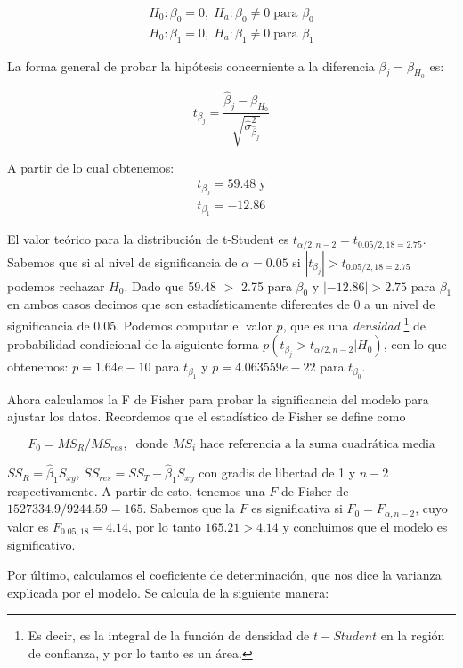 \documentclass[letterpaper,12pt]{article}
\begin{document}
\[
\begin{aligned}
H_0: \beta_0 = 0,\; H_a: \beta_0 \neq 0\; \text{para $\beta_0$}\\\hline
H_0: \beta_1 = 0,\; H_a: \beta_1 \neq 0\; \text{para $\beta_1$}
\end{aligned}
\]

La forma general de probar la hipótesis concerniente a la diferencia $\beta_j = \beta_{H_0}$ es:

\begin{equation}
	t_{\beta_j} = \frac{\hat{\beta}_j-\beta_{H_0}}{\sqrt{\hat{\sigma}_{\hat{\beta}_j}^2}}
\end{equation}

A partir de lo cual obtenemos:
\[
\begin{aligned}
t_{\beta_0} = 59.48\; \text{y} \\
t_{\beta_1} = -12.86
\end{aligned}
\]

El valor teórico para la distribución de t-Student es $t_{\alpha/2,n-2} = t_{0.05/2,18 = 2.75}$. Sabemos que si al nivel de significancia de $\alpha = 0.05$ si $|t_{\beta_j}| > t_{0.05/2,18 = 2.75}$ podemos rechazar $H_0$. Dado que 59.48 $>$ 2.75 para $\beta_0$ y $|-12.86|>2.75$ para $\beta_1$ en ambos casos decimos que son estadísticamente diferentes de 0 a un nivel de significancia de 0.05. Podemos computar el valor $p$, que es una \textit{densidad} \footnote{Es decir, es la integral de la función de densidad de $t-Student$ en la región de confianza, y por lo tanto es un área.} de probabilidad condicional de la siguiente forma $p(t_{\beta_{j}}> t_{\alpha/2,n-2}|H_0)$, con lo que obtenemos: $p = 1.64e-10$ para $t_{\beta_1}$ y $p =4.063559e-22$ para $t_{\beta_0}$. 

Ahora calculamos la F de Fisher para probar la significancia del modelo para ajustar los datos. Recordemos que el estadístico de Fisher se define como


\[
F_0 = MS_R/MS_{res},\;\; \text{donde $MS_i$ hace referencia a la suma cuadrática media}
\]

$SS_R = \hat{\beta}_1S_{xy}$, $SS_{res} = SS_T - \hat{\beta}_1S_{xy}$ con gradis de libertad de 1 y $n-2$ respectivamente. A partir de esto, tenemos una $F$ de Fisher de $1527334.9/9244.59 = 165$. Sabemos que la $F$ es significativa si $F_0 = F_{\alpha,n-2}$, cuyo valor es $F_{0.05,18}=4.14$, por lo tanto $165.21>4.14$ y concluimos que el modelo es significativo. 

Por último, calculamos el coeficiente de determinación, que nos dice la varianza explicada por el modelo. Se calcula de la siguiente manera:
\end{document}
